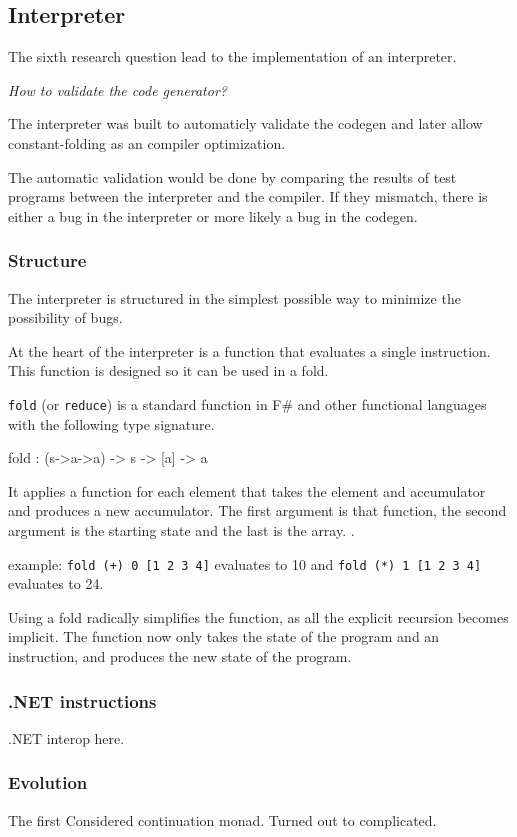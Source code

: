 \subsection{Interpreter}
The sixth research question lead to the implementation of an interpreter.

\textit{How to validate the code generator?}

The interpreter was built to automaticly validate the codegen and later allow constant-folding as an compiler optimization.

The automatic validation would be done by comparing the results of test programs between the interpreter and the compiler.
If they mismatch, there is either a bug in the interpreter or more likely a bug in the codegen.

\subsubsection{Structure}
The interpreter is structured in the simplest possible way to minimize the possibility of bugs.

At the heart of the interpreter is a function that evaluates a single instruction.
This function is designed so it can be used in a fold.

\verb|fold| (or \verb|reduce|) is a standard function in F\# and other functional languages with the following type signature.

\begin{code}
    fold : (s->a->a) -> s -> [a] -> a
\end{code}

It applies a function for each element that takes the element and accumulator and produces a new accumulator.
The first argument is that function, the second argument is the starting state and the last is the array.
\cite{realworldhaskellch4}.

example: \texttt{fold (+) 0 [1 2 3 4]} evaluates to 10 and \texttt{fold (*) 1 [1 2 3 4]} evaluates to 24.

Using a fold radically simplifies the function, as all the explicit recursion becomes implicit.
The function now only takes the state of the program and an instruction, and produces the new state of the program.

\subsubsection{.NET instructions}
.NET interop here.

\subsubsection{Evolution}
The first 
Considered continuation monad.
Turned out to complicated.
